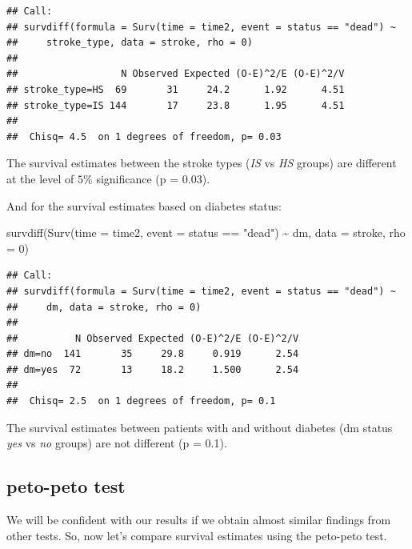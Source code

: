 \documentclass[
  10pt,
]{krantz}
\newenvironment{Shaded}{\begin{snugshade}}{\end{snugshade}}
\newcommand{\AttributeTok}[1]{\textcolor[rgb]{0.77,0.63,0.00}{#1}}
\newcommand{\DecValTok}[1]{\textcolor[rgb]{0.00,0.00,0.81}{#1}}
\newcommand{\FunctionTok}[1]{\textcolor[rgb]{0.00,0.00,0.00}{#1}}
\newcommand{\NormalTok}[1]{#1}
\newcommand{\SpecialCharTok}[1]{\textcolor[rgb]{0.00,0.00,0.00}{#1}}
\newcommand{\StringTok}[1]{\textcolor[rgb]{0.31,0.60,0.02}{#1}}
\begin{document}
\begin{verbatim}
## Call:
## survdiff(formula = Surv(time = time2, event = status == "dead") ~ 
##     stroke_type, data = stroke, rho = 0)
## 
##                  N Observed Expected (O-E)^2/E (O-E)^2/V
## stroke_type=HS  69       31     24.2      1.92      4.51
## stroke_type=IS 144       17     23.8      1.95      4.51
## 
##  Chisq= 4.5  on 1 degrees of freedom, p= 0.03
\end{verbatim}

The survival estimates between the stroke types (\emph{IS} vs \emph{HS} groups) are different at the level of \(5\%\) significance (p = 0.03).

And for the survival estimates based on diabetes status:

\begin{Shaded}
\begin{Highlighting}[]
\FunctionTok{survdiff}\NormalTok{(}\FunctionTok{Surv}\NormalTok{(}\AttributeTok{time =}\NormalTok{ time2, }
              \AttributeTok{event =}\NormalTok{ status }\SpecialCharTok{==} \StringTok{"dead"}\NormalTok{) }\SpecialCharTok{\textasciitilde{}}\NormalTok{ dm, }
         \AttributeTok{data =}\NormalTok{ stroke,}
         \AttributeTok{rho =} \DecValTok{0}\NormalTok{)}
\end{Highlighting}
\end{Shaded}

\begin{verbatim}
## Call:
## survdiff(formula = Surv(time = time2, event = status == "dead") ~ 
##     dm, data = stroke, rho = 0)
## 
##          N Observed Expected (O-E)^2/E (O-E)^2/V
## dm=no  141       35     29.8     0.919      2.54
## dm=yes  72       13     18.2     1.500      2.54
## 
##  Chisq= 2.5  on 1 degrees of freedom, p= 0.1
\end{verbatim}

The survival estimates between patients with and without diabetes (dm status \emph{yes} vs \emph{no} groups) are not different (p = 0.1).

\hypertarget{peto-peto-test}{%
\subsection{\texorpdfstring{peto-peto test}{peto-peto test}}\label{peto-peto-test}}

We will be confident with our results if we obtain almost similar findings from other tests. So, now let's compare survival estimates using the peto-peto test.
\end{document}

